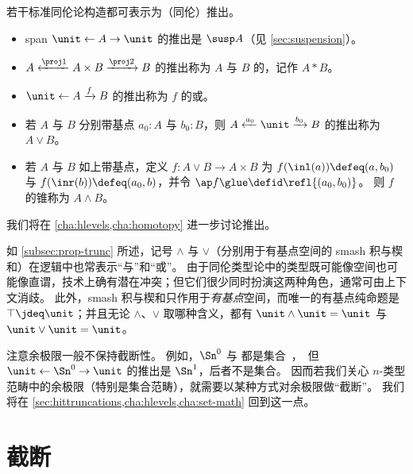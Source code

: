 若干标准同伦论构造都可表示为（同伦）推出。
\begin{itemize}
\item span $\unit \leftarrow A \to \unit$ 的推出是 $\susp A$（见 \cref{sec:suspension}）。%
\item $A \xleftarrow{\proj1} A\times B \xrightarrow{\proj2} B$ 的推出称为 $A$ 与 $B$ 的，记作 $A*B$。%
\item $\unit \leftarrow A \xrightarrow{f} B$ 的推出称为 $f$ 的或。%
\item 若 $A$ 与 $B$ 分别带基点 $a_0:A$ 与 $b_0:B$，则 $A \xleftarrow{a_0} \unit \xrightarrow{b_0} B$ 的推出称为 $A\vee B$。%
\item 若 $A$ 与 $B$ 如上带基点，定义 $f:A\vee B \to A\times B$ 为 $f(\inl(a))\defeq (a,b_0)$ 与 $f(\inr(b))\defeq (a_0,b)$，并令 $\ap f \glue \defid \refl{(a_0,b_0)}$。
  则 $f$ 的锥称为 $A\wedge B$。%
\end{itemize}
我们将在 \cref{cha:hlevels,cha:homotopy} 进一步讨论推出。

\begin{rmk}
  如 \cref{subsec:prop-trunc} 所述，记号 $\wedge$ 与 $\vee$（分别用于有基点空间的 smash 积与楔和）在逻辑中也常表示“与”和“或”。
  由于同伦类型论中的类型既可能像空间也可能像直谓，技术上确有潜在冲突；但它们很少同时扮演这两种角色，通常可由上下文消歧。
  此外，smash 积与楔和只作用于\emph{有基点}空间，而唯一的有基点纯命题是 $\top\jdeq\unit$；并且无论 $\wedge$、$\vee$ 取哪种含义，都有 $\unit\wedge \unit = \unit$ 与 $\unit\vee\unit=\unit$。
\end{rmk}

%

\begin{rmk}
  注意余极限一般不保持截断性。
  例如，$\Sn^0$ 与 \unit 都是集合，但 $\unit \leftarrow \Sn^0 \to \unit$ 的推出是 $\Sn^1$，后者不是集合。
  因而若我们关心 $n$-类型范畴中的余极限（特别是集合范畴），就需要以某种方式对余极限做“截断”。
  我们将在 \cref{sec:hittruncations,cha:hlevels,cha:set-math} 回到这一点。
\end{rmk}

\section{截断}
\label{sec:hittruncations}

